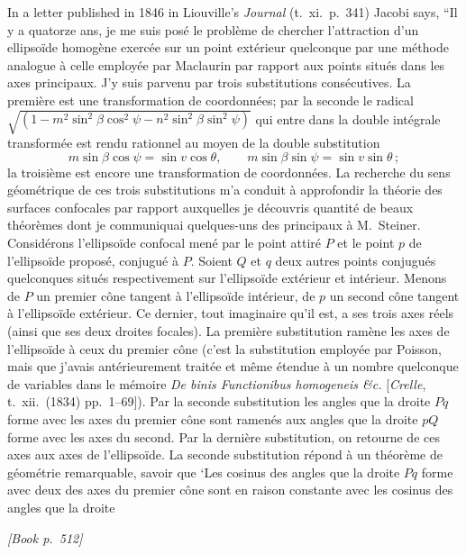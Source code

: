 \documentclass[11pt]{article}
\begin{document}
\noindent In a letter published in 1846 in Liouville's \emph{Journal} (t.~xi.\ p.~341) Jacobi says, ``Il y a quatorze ans, je me suis pos\'e le probl\`eme de chercher l'attraction d'un ellipso\"ide homog\`ene exerc\'ee sur un point ext\'erieur quelconque par une m\'ethode analogue \`a celle employ\'ee par Maclaurin par rapport aux points situ\'es dans les axes principaux. J'y suis parvenu par trois substitutions cons\'ecutives. La premi\`ere est une transformation de coordonn\'ees; par la seconde le radical $\sqrt{(1 - m^{2} \sin^{2}\beta \cos^{2}\psi - n^{2} \sin^{2}\beta \sin^{2}\psi)}$ qui entre dans la double int\'egrale transform\'ee est rendu rationnel au moyen de la double substitution
\[
m \sin\beta \cos\psi = \sin v \cos\theta,\qquad m \sin\beta \sin\psi = \sin v \sin\theta\,;
\]
la troisi\`eme est encore une transformation de coordonn\'ees. La recherche du sens g\'eom\'etrique de ces trois substitutions m'a conduit \`a approfondir la th\'eorie des surfaces confocales par rapport auxquelles je d\'ecouvris quantit\'e de beaux th\'eor\`emes dont je communiquai quelques-uns des principaux \`a M.~Steiner. Consid\'erons l'ellipso\"ide confocal men\'e par le point attir\'e $P$ et le point $p$ de l'ellipso\"ide propos\'e, conjugu\'e \`a $P$. Soient $Q$ et $q$ deux autres points conjugu\'es quelconques situ\'es respectivement sur l'ellipso\"ide ext\'erieur et int\'erieur. Menons de $P$ un premier c\^one tangent \`a l'ellipso\"ide int\'erieur, de $p$ un second c\^one tangent \`a l'ellipso\"ide ext\'erieur. Ce dernier, tout imaginaire qu'il est, a ses trois axes r\'eels (ainsi que ses deux droites focales). La premi\`ere substitution ram\`ene les axes de l'ellipso\"ide \`a ceux du premier c\^one (c'est la substitution employ\'ee par Poisson, mais que j'avais ant\'erieurement trait\'ee et m\^eme \'etendue \`a un nombre quelconque de variables dans le m\'emoire \emph{De binis Functionibus homogeneis \&c.} [\emph{Crelle}, t.~xii.\ (1834) pp.~1--69]). Par la seconde substitution les angles que la droite $Pq$ forme avec les axes du premier c\^one sont ramen\'es aux angles que la droite $pQ$ forme avec les axes du second. Par la derni\`ere substitution, on retourne de ces axes aux axes de l'ellipso\"ide. La seconde substitution r\'epond \`a un th\'eor\`eme de g\'eom\'etrie remarquable, savoir que `Les cosinus des angles que la droite $Pq$ forme avec deux des axes du premier c\^one sont en raison constante avec les cosinus des angles que la droite

\medskip
\noindent\textit{[Book p.~512]}\hfill
\end{document}
